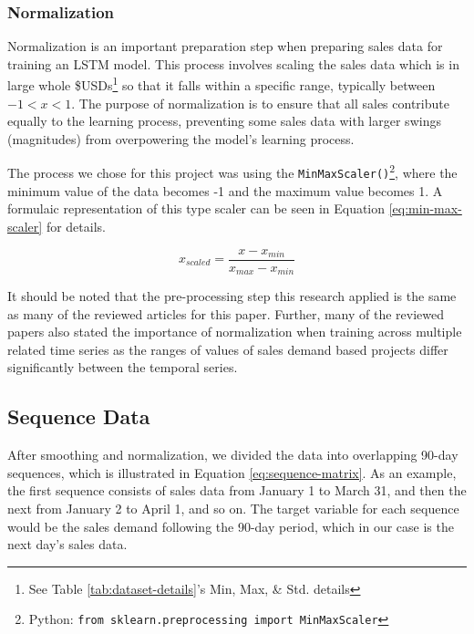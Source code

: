 \documentclass[10pt, conference, compsoc]{IEEEtran}
\begin{document}
\subsubsection{Normalization}
Normalization is an important preparation step when preparing sales data for training an LSTM model\cite{improved-sales-forecasting}. This process involves scaling the sales data which is in large whole \$USDs\footnote{See Table \ref{tab:dataset-details}'s Min, Max, \& Std. details} so that it falls within a specific range, typically between $-1 < x < 1$. The purpose of normalization is to ensure that all sales contribute equally to the learning process, preventing some sales data with larger swings (magnitudes) from overpowering\cite{improved-sales-forecasting} the model's learning process.

The process we chose for this project was using the \texttt{MinMaxScaler()}\footnote{Python: \texttt{from sklearn.preprocessing import MinMaxScaler}}, where the minimum value of the data becomes \textsc{-1} and the maximum value becomes \textsc{1}. A formulaic representation of this type scaler can be seen in Equation \ref{eq:min-max-scaler} for details.

\begin{equation}
x_{scaled} = \frac{x-x_{min}}{x_{max}-x_{min}}
\label{eq:min-max-scaler}
\end{equation}

It should be noted that the pre-processing step this research applied is the same as many of the reviewed articles\cite{demand-forecasting-lstm, improved-sales-forecasting} for this paper. Further, many of the reviewed papers\cite{demand-forecasting-lstm} also stated the importance of normalization when training across multiple related time series as the ranges of values of sales demand based projects differ significantly between the temporal series.


\subsection{Sequence Data}
After smoothing and normalization, we divided the data into overlapping 90-day sequences, which is illustrated in Equation \ref{eq:sequence-matrix}. As an example, the first sequence consists of sales data from January 1 to March 31, and then the next from January 2 to April 1, and so on. The target variable for each sequence would be the sales demand following the 90-day period, which in our case is the next day's sales data.
\end{document}
